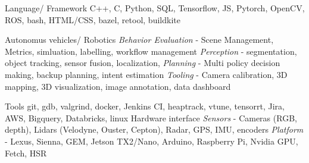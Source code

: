 \vspace{-2mm}

\begin{cvskills}

  \cvskill
    {Language/ Framework} %
    {C++, C, Python, SQL, Tensorflow, JS, Pytorch, OpenCV, ROS, bash, HTML/CSS, bazel, retool, buildkite} %

  \cvskill
	{Autonomus vehicles/ Robotics} %
	{\textit{Behavior Evaluation} - Scene Management, Metrics, simluation, labelling, workflow management\linebreak
	\textit{Perception} - segmentation, object tracking, sensor fusion, localization,\linebreak
	\textit{Planning} - Multi policy decision making, backup planning, intent estimation\linebreak
	\textit{Tooling} - Camera calibration, 3D mapping, 3D visualization, image annotation, data dashboard} %

	\cvskill
	{Tools} %
	{git, gdb, valgrind, docker, Jenkins CI, heaptrack, vtune, tensorrt, Jira, AWS, Bigquery, Databricks, linux } %
	\cvskill
	{Hardware interface} %
	{\textit{Sensors} - Cameras (RGB, depth), Lidars (Velodyne, Ouster, Cepton), Radar, GPS, IMU, encoders\linebreak
	\textit{Platform} - Lexus, Sienna, GEM, Jetson TX2/Nano, Arduino, Raspberry Pi, Nvidia GPU,  Fetch, HSR} %

\end{cvskills}
